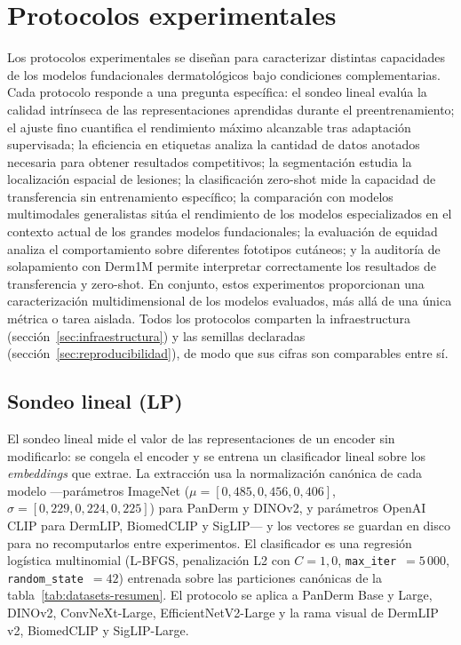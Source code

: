 \section{Protocolos experimentales}
\label{sec:protocolos}

Los protocolos experimentales se diseñan para caracterizar
distintas capacidades de los modelos fundacionales dermatológicos
bajo condiciones complementarias. Cada protocolo responde a una
pregunta específica: el sondeo lineal evalúa la calidad intrínseca
de las representaciones aprendidas durante el preentrenamiento; el
ajuste fino cuantifica el rendimiento máximo alcanzable tras
adaptación supervisada; la eficiencia en etiquetas analiza la
cantidad de datos anotados necesaria para obtener resultados
competitivos; la segmentación estudia la localización espacial de
lesiones; la clasificación zero-shot mide la capacidad de
transferencia sin entrenamiento específico; la comparación con
modelos multimodales generalistas sitúa el rendimiento de los
modelos especializados en el contexto actual de los grandes modelos
fundacionales; la evaluación de equidad analiza el comportamiento
sobre diferentes fototipos cutáneos; y la auditoría de solapamiento
con Derm1M permite interpretar correctamente los resultados de
transferencia y zero-shot. En conjunto, estos experimentos
proporcionan una caracterización multidimensional de los modelos
evaluados, más allá de una única métrica o tarea aislada. Todos los
protocolos comparten la infraestructura
(sección~\ref{sec:infraestructura}) y las semillas declaradas
(sección~\ref{sec:reproducibilidad}), de modo que sus cifras son
comparables entre sí.

\subsection{Sondeo lineal (LP)}
\label{sec:lp}

El sondeo lineal mide el valor de las representaciones de un encoder
sin modificarlo: se congela el encoder y se entrena un clasificador
lineal sobre los \emph{embeddings} que extrae. La extracción usa la
normalización canónica de cada modelo —parámetros ImageNet
($\mu=[0{,}485, 0{,}456, 0{,}406]$,
$\sigma=[0{,}229, 0{,}224, 0{,}225]$) para PanDerm y DINOv2, y
parámetros OpenAI CLIP para DermLIP, BiomedCLIP y SigLIP— y los
vectores se guardan en disco para no recomputarlos entre
experimentos. El clasificador es una regresión logística multinomial
(L-BFGS, penalización L2 con $C = 1{,}0$, \texttt{max\_iter}~$=5\,000$,
\texttt{random\_state}~$=42$) entrenada sobre las particiones
canónicas de la tabla~\ref{tab:datasets-resumen}. El protocolo se
aplica a PanDerm Base y Large, DINOv2, ConvNeXt-Large,
EfficientNetV2-Large y la rama visual de DermLIP v2, BiomedCLIP y
SigLIP-Large.

